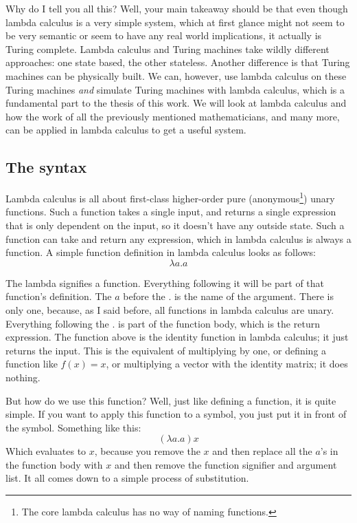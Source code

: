 \documentclass[11pt]{article}
\begin{document}
Why do I tell you all this? Well, your main takeaway should be that even though
lambda calculus is a very simple system, which at first glance might not seem
to be very semantic or seem to have any real world implications, it actually is
Turing complete. Lambda calculus and Turing machines take wildly different
approaches: one state based, the other stateless. Another difference is that
Turing machines can be physically built. We can, however, use lambda calculus
on these Turing machines \emph{and} simulate Turing machines with lambda
calculus, which is a fundamental part to the thesis of this work. We will look
at lambda calculus and how the work of all the previously mentioned
mathematicians, and many more, can be applied in lambda calculus to get a
useful system.

\subsection{The syntax}\label{syntax}

Lambda calculus is all about first-class higher-order pure
(anonymous\footnote{The core lambda calculus has no way of naming functions.})
unary functions. Such a function takes a single input, and returns a single
expression that is only dependent on the input, so it doesn't have any outside
state. Such a function can take and return any expression, which in lambda
calculus is always a function. A simple function definition in lambda calculus
looks as follows: \[\lambda a.a\]

The lambda signifies a function. Everything following it will be part of that
function's definition. The \(a\) before the \(.\) is the name of the argument.
There is only one, because, as I said before, all functions in lambda calculus
are unary. Everything following the \(.\) is part of the function body, which
is the return expression. The function above is the identity function in lambda
calculus; it just returns the input. This is the equivalent of multiplying by
one, or defining a function like \(f(x)=x\), or multiplying a vector with the
identity matrix; it does nothing.

But how do we use this function? Well, just like defining a function, it is
quite simple. If you want to apply this function to a symbol, you just put it
in front of the symbol. Something like this:
\[(\lambda a.a)x\]
Which evaluates to \(x\), because you remove the \(x\) and then replace all the
\(a\)'s in the function body with \(x\) and then remove the function signifier
and argument list. It all comes down to a simple process of substitution.
\end{document}
